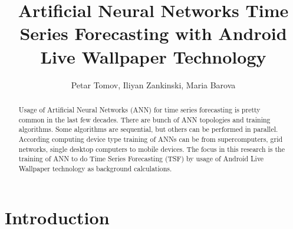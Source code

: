 \documentclass{llncs}
\begin{document}
\title{Artificial Neural Networks Time Series Forecasting with Android Live Wallpaper Technology} 

\author{Petar Tomov, Iliyan Zankinski, Maria Barova}



\maketitle


\begin{abstract}
Usage of Artificial Neural Networks (ANN) for time series forecasting is pretty common in the last few decades. There are bunch of ANN topologies and training algorithms. Some algorithms are sequential, but others can be performed in parallel. According computing device type training of ANNs can be from supercomputers, grid networks, single desktop computers to mobile devices. The focus in this research is the training of ANN to do Time Series Forecasting (TSF) by usage of Android Live Wallpaper technology as background calculations. 

\end{abstract}


\section{Introduction}
\end{document}
